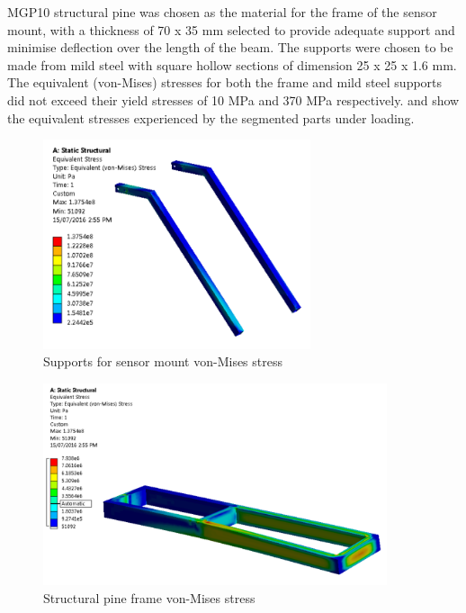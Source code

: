 \documentclass[main.tex]{subfiles}
\begin{document}
MGP10 structural pine was chosen as the material for the frame of the sensor mount, with a thickness of 70 x 35 mm selected to provide adequate support and minimise deflection over the length of the beam. The supports were chosen to be made from mild steel with square hollow sections of dimension 25 x 25 x 1.6 mm. The equivalent (von-Mises) stresses for both the frame and mild steel supports did not exceed their yield stresses of 10 MPa and 370 MPa respectively.  and  show the equivalent stresses experienced by the segmented parts under loading.
%
\begin{figure}[ht]
\includegraphics[width=0.7\textwidth]{4-DetailedDesign/topFrame.PNG}
\centering
\caption{Supports for sensor mount von-Mises stress} 
\end{figure}

\begin{figure}[ht]
\includegraphics[width=0.9\textwidth]{4-DetailedDesign/bottomFrame.PNG}
\centering
\caption{Structural pine frame von-Mises stress} 
\end{figure}
\end{document}
